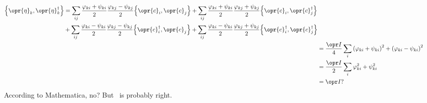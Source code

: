 \documentclass[../thesis.tex]{subfiles}
\begin{document}
\begin{align}
  \begin{split}
    \acomm{\opr{\eta}_k}{\opr{\eta}_k^\dag}
  &=
  \sum_{ij}
  \frac{\varphi_{ki} + \psi_{ki}}{2}
  \frac{\varphi_{kj} - \psi_{kj}}{2}
  \acomm{\opr{c}_i}{\opr{c}_j}
  +
  \sum_{ij}
  \frac{\varphi_{ki} + \psi_{ki}}{2}
  \frac{\varphi_{kj} + \psi_{kj}}{2}
  \acomm{\opr{c}_i}{\opr{c}_j^\dag} \\
  &+
  \sum_{ij}
  \frac{\varphi_{ki} - \psi_{ki}}{2}
  \frac{\varphi_{kj} - \psi_{kj}}{2}
  \acomm{\opr{c}_i^\dag}{\opr{c}_j}
  +
  \sum_{ij}
  \frac{\varphi_{ki} - \psi_{ki}}{2}
  \frac{\varphi_{kj} + \psi_{kj}}{2}
  \acomm{\opr{c}_i^\dag}{\opr{c}_j^\dag}
  \end{split} \\
  &= \frac{\idopr}{4} \sum_{i}
  {\qty(\varphi_{ki} + \psi_{ki})}^2
  + {\qty(\varphi_{ki} - \psi_{ki})}^2
  \\
  &= \frac{\idopr}{2} \sum_{i}
  \varphi_{ki}^2 + \psi_{ki}^2
  \\
  &= \idopr?
\end{align}
According to Mathematica, no? But~\cite[pp.~452--454]{liebTwoSolubleModels1961}
is probably right.
\end{document}
